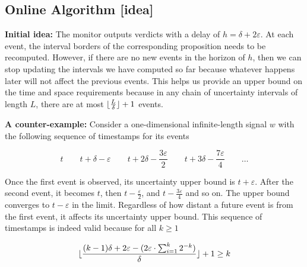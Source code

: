 \documentclass[envcountsame, runningheads]{llncs}
\newcommand{\?}{\text{?}}
\DeclarePairedDelimiter\floor{\lfloor}{\rfloor}
\begin{document}
	
	\subsection*{Online Algorithm [idea]}
	\textbf{Initial idea:}
	The monitor outputs verdicts with a delay of $h = \delta + 2\varepsilon$.
	At each event, the interval borders of the corresponding proposition needs to be recomputed.
	However, if there are no new events in the horizon of $h$, then we can stop updating the intervals we have computed so far because whatever happens later will not affect the previous events.
	This helps us provide an upper bound on the time and space requirements because in any chain of uncertainty intervals of length $L$, there are at most $\floor{\frac{L}{\delta}} + 1$ events.
	
	\vspace{1em}
	\noindent
	\textbf{A counter-example:} Consider a one-dimensional infinite-length signal $w$ with the following sequence of timestamps for its events
	
	$$ t \hspace{2em} t + \delta - \varepsilon \hspace{2em} t + 2\delta - \frac{3\varepsilon}{2} \hspace{2em} t + 3\delta - \frac{7\varepsilon}{4} \hspace{2em} \ldots $$
	
	Once the first event is observed, its uncertainty upper bound is $t + \varepsilon$.
	After the second event, it becomes $t$, then $t - \frac{\varepsilon}{2}$, and $t - \frac{3\varepsilon}{4}$ and so on.
	The upper bound converges to $t - \varepsilon$ in the limit.
	Regardless of how distant a future event is from the first event, it affects its uncertainty upper bound.
	This sequence of timestamps is indeed valid because for all $k \geq 1$
	
	$$ \floor{\frac{(k-1)\delta + 2\varepsilon - (2\varepsilon \cdot \sum_{i=1}^{k}2^{-k})}{\delta}} + 1 \geq k $$

	
	\newpage
	
	
\end{document}
